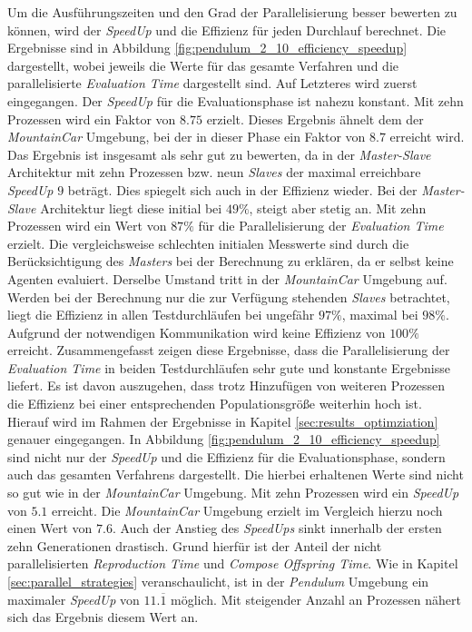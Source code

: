 Um die Ausführungszeiten und den Grad der Parallelisierung besser bewerten zu können, wird der \emph{SpeedUp} und die Effizienz für jeden Durchlauf berechnet. Die Ergebnisse sind in Abbildung \ref{fig:pendulum_2_10_efficiency_speedup} dargestellt, wobei jeweils die Werte für das gesamte Verfahren und die parallelisierte \emph{Evaluation Time} dargestellt sind. Auf Letzteres wird zuerst eingegangen. Der \emph{SpeedUp} für die Evaluationsphase ist nahezu konstant. Mit zehn Prozessen wird ein Faktor von $8.75$ erzielt. Dieses Ergebnis ähnelt dem der \emph{MountainCar} Umgebung, bei der in dieser Phase ein Faktor von $8.7$ erreicht wird. Das Ergebnis ist insgesamt als sehr gut zu bewerten, da in der \emph{Master-Slave} Architektur mit zehn Prozessen bzw. neun \emph{Slaves} der maximal erreichbare \emph{SpeedUp} $9$ beträgt. Dies spiegelt sich auch in der Effizienz wieder. Bei der \emph{Master-Slave} Architektur liegt diese initial bei $49\%$, steigt aber stetig an. Mit zehn Prozessen wird ein Wert von $87\%$ für die Parallelisierung der \emph{Evaluation Time} erzielt. Die vergleichsweise schlechten initialen Messwerte sind durch die Berücksichtigung des \emph{Masters} bei der Berechnung zu erklären, da er selbst keine Agenten evaluiert. Derselbe Umstand tritt in der \emph{MountainCar} Umgebung auf. Werden bei der Berechnung nur die zur Verfügung stehenden \emph{Slaves} betrachtet, liegt die Effizienz in allen Testdurchläufen bei ungefähr $97\%$, maximal bei $98\%$. Aufgrund der notwendigen Kommunikation wird keine Effizienz von $100\%$ erreicht. Zusammengefasst zeigen diese Ergebnisse, dass die Parallelisierung der \emph{Evaluation Time} in beiden Testdurchläufen sehr gute und konstante Ergebnisse liefert. Es ist davon auszugehen, dass trotz Hinzufügen von weiteren Prozessen die Effizienz bei einer entsprechenden Populationsgröße weiterhin hoch ist. Hierauf wird im Rahmen der Ergebnisse in Kapitel \ref{sec:results_optimziation} genauer eingegangen. In Abbildung \ref{fig:pendulum_2_10_efficiency_speedup} sind nicht nur der \emph{SpeedUp} und die Effizienz für die Evaluationsphase, sondern auch das gesamten Verfahrens dargestellt. Die hierbei erhaltenen Werte sind nicht so gut wie in der \emph{MountainCar} Umgebung. Mit zehn Prozessen wird ein \emph{SpeedUp} von $5.1$ erreicht. Die \emph{MountainCar} Umgebung erzielt im Vergleich hierzu noch einen Wert von $7.6$. Auch der Anstieg des \emph{SpeedUps} sinkt innerhalb der ersten zehn Generationen drastisch. Grund hierfür ist der Anteil der nicht parallelisierten \emph{Reproduction Time} und \emph{Compose Offspring Time}. Wie in Kapitel \ref{sec:parallel_strategies} veranschaulicht, ist in der \emph{Pendulum} Umgebung ein maximaler \emph{SpeedUp} von $11.\overline{1}$ möglich. Mit steigender Anzahl an Prozessen nähert sich das Ergebnis diesem Wert an.

